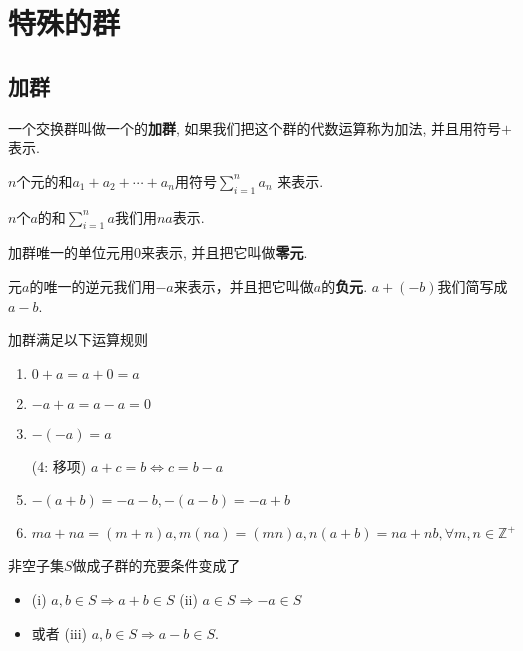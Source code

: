\section{特殊的群}

\subsection{加群}

\begin{Definition}[加群]
一个交换群叫做一个的\textbf{加群}, 如果我们把这个群的代数运算称为加法, 并且用符号$+$表示.
\end{Definition}

\begin{Definition}[$\Sigma$]
{{
$n$个元的和$a_1 + a_2 + \cdots + a_n$用符号$\displaystyle \sum_{i=1}^{n} a_n$ 来表示.
}
}
\end{Definition}

\begin{Definition}
$n$个$a$的和$\displaystyle \sum_{i=1}^{n} a$我们用$na$表示.
\end{Definition}

\begin{Definition}[零元]
加群唯一的单位元用$\mathfrak{0}$来表示, 并且把它叫做\textbf{零元}.
\end{Definition}

\begin{Definition}[负元]
元$a$的唯一的逆元我们用$-a$来表示，并且把它叫做$a$的\textbf{负元}. $a + (-b)$我们简写成$a - b$.
\end{Definition}

\begin{Theorem}
加群满足以下运算规则
\begin{enumerate}[(1)]
\item $\mathfrak{0} + a = a + \mathfrak{0} = a$
\item $-a + a = a - a = \mathfrak{0}$
\item $-(-a) = a$
\item[(4: 移项)] $a + c = b \Leftrightarrow c = b - a$
\item $-(a +b) = -a - b, -(a-b) = -a +b$
\item $ma + na = (m+n)a, m(na) = (mn)a, n(a+b) = na + nb, \forall m, n \in \mathbb{Z}^+$
\end{enumerate}
\end{Theorem}

\begin{Note}
非空子集$S$做成子群的充要条件变成了 
\begin{itemize}
\item (i) $a, b \in S \Rightarrow a+b \in S$ (ii) $a \in S \Rightarrow -a \in S$
\item 或者 (iii) $a, b \in S \Rightarrow a - b \in S$.
\end{itemize}
\end{Note}


